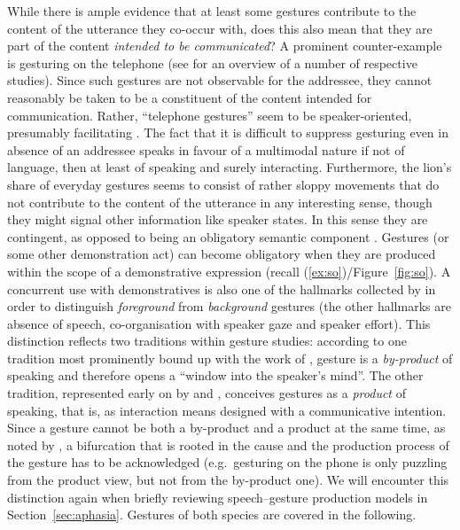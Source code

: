 \documentclass[output=paper
 	        ,biblatex
                ,babelshorthands
                ,newtxmath
                ,draftmode
                ,colorlinks, citecolor=brown
]{langscibook}
\begin{document}
While there is ample evidence that at least some gestures contribute to the content of the utterance they co-occur with, does this also mean that they are part of the content \emph{intended to be communicated}?
%
A prominent counter-example is gesturing on the telephone (see \citealt{Bavelas:Gerwing:Sutton:Prevost:2008} for an overview of a number of respective studies).
%
Since such gestures are not observable for the addressee, they cannot reasonably be taken to be a constituent of the content intended for communication.
%
Rather, \enquote{telephone gestures} seem to be speaker-oriented, presumably facilitating .
%
The fact that it is difficult to suppress gesturing even in absence of an addressee speaks in favour of a multimodal nature if not of language, then at least of speaking and surely interacting.
%
Furthermore, the lion's share of everyday gestures seems to consist of rather sloppy movements that do not contribute to the content of the utterance in any interesting sense, though they might signal other information like speaker states.
%
In this sense they are contingent, as opposed to being an obligatory semantic component \citep{Luecking:2013:a}.
%
Gestures (or some other demonstration act) can become obligatory when they are produced within the scope of a demonstrative expression (recall (\ref{ex:so})/Figure~\ref{fig:so}).
%
A concurrent use with demonstratives is also one of the hallmarks collected by \citet{Cooperrider:2017} in order to distinguish \emph{foreground} from \emph{background} gestures (the other hallmarks are absence of speech, co-organisation with speaker gaze and speaker effort).
%
This distinction reflects two traditions within gesture studies: according to one tradition most prominently bound up with the work of \citet{McNeill:1992}, gesture is a \emph{by-product} of speaking and therefore opens a \enquote{window into the speaker's mind}.
%
The other tradition, represented early on by \citet{Goodwin:2003} and \citet{Clark:1996}, conceives gestures as a \emph{product} of speaking, that is, as interaction means designed with a communicative intention.
%
Since a gesture cannot be both a by-product and a product at the same time, as noted by \citet{Cooperrider:2017}, a bifurcation that is rooted in the cause and the production process of the gesture has to be acknowledged (e.g.\ gesturing on the phone is only puzzling from the product view, but not from the by-product one). 
%
We will encounter this distinction again when briefly reviewing speech--gesture production models in Section~\ref{sec:aphasia}.
%
Gestures of both species are covered in the following.
\end{document}
